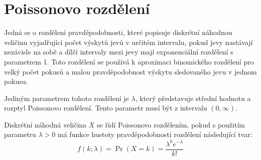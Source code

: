 \documentclass[12pt, a4paper]{article}
\let\oldsection\section
\renewcommand\section{\clearpage\oldsection}
\begin{document}
\section{Poissonovo rozdělení}
    Jedná se o rozdělení pravděpodobnosti, které popisuje diskrétní náhodnou veličinu vyjadřující počet výskytů jevů v určitém intervalu, pokud jevy nastávají nezávisle na sobě a dílčí intervaly mezi jevy mají exponenciální rozdělení s parametrem 1.
Toto rozdělení se používá k aproximaci binomického rozdělení pro velký počet pokusů a malou pravděpodobnost výskytu sledovaného jevu v jednom pokusu.

    Jediným parametrem tohoto rozdělení je $\lambda$, který představuje střední hodnotu a rozptyl Poissonovo rozdělení. Tento parametr musí být z intervalu $(0, \infty)$.

     Diskrétní náhodná veličina $X$ se řídí Poissonovo rozdělením, pokud s použitím parametru $\lambda > 0$ má funkce hustoty pravděpodobnosti rozdělení následující tvar:
    \begin{displaymath}
       \!f(k; \lambda)= \Pr(X{=}k)= \frac{\lambda^k e^{-\lambda}}{k!}
    \end{displaymath}
\end{document}
